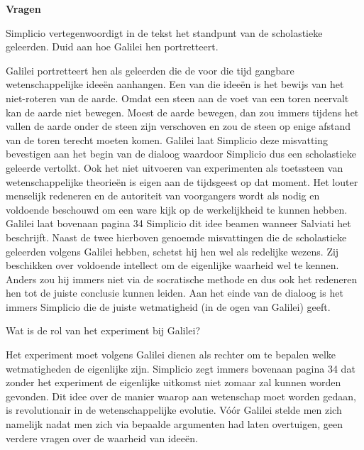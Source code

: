\documentclass{ximera}
\begin{document}
	
	
	\textbf{Vragen}
	\begin{exercise}
    \begin{question}  Simplicio vertegenwoordigt in de tekst het standpunt van de scholastieke geleerden. Duid aan hoe Galilei hen portretteert.
	\begin{oplossing}
	Galilei portretteert hen als geleerden die de voor die tijd gangbare wetenschappelijke ideeën aanhangen. 
	Een van die ideeën is het bewijs van het niet-roteren van de aarde. Omdat een steen aan de voet van een toren neervalt kan de aarde niet bewegen. Moest de aarde bewegen, dan zou immers tijdens het vallen de aarde onder de steen zijn verschoven en zou de steen op enige afstand van de toren terecht moeten komen. Galilei laat Simplicio deze misvatting bevestigen aan het begin van de dialoog waardoor Simplicio dus een scholastieke geleerde vertolkt.
	Ook het niet uitvoeren van experimenten als toetssteen van wetenschappelijke theorieën is eigen aan de tijdsgeest op dat moment. Het louter menselijk redeneren en de autoriteit van voorgangers wordt als nodig en voldoende beschouwd om een ware kijk op de werkelijkheid te kunnen hebben. Galilei laat bovenaan pagina 34 Simplicio dit idee beamen wanneer Salviati het beschrijft.
	Naast de twee hierboven genoemde misvattingen die de scholastieke geleerden volgens Galilei hebben, schetst hij hen wel als redelijke wezens. Zij beschikken over voldoende intellect om de eigenlijke waarheid wel te kennen. Anders zou hij immers niet via de socratische methode en dus ook het redeneren hen tot de juiste conclusie kunnen leiden. Aan het einde van de dialoog is het immers Simplicio die de juiste wetmatigheid (in de ogen van Galilei) geeft.
	\end{oplossing}
	\end{question}
	
    \begin{question}  Wat is de rol van het experiment bij Galilei?
	\begin{oplossing}
	Het experiment moet volgens Galilei dienen als rechter om te bepalen welke wetmatigheden de eigenlijke zijn. Simplicio zegt immers bovenaan pagina 34 dat zonder het experiment de eigenlijke uitkomst niet zomaar zal kunnen worden gevonden. Dit idee over de manier waarop aan wetenschap moet worden gedaan, is revolutionair in de wetenschappelijke evolutie. V\'o\'or Galilei stelde men zich namelijk nadat men zich via bepaalde argumenten had laten overtuigen, geen verdere vragen over de waarheid van ideeën. 
	\end{oplossing}
	\end{question}
	

\end{exercise}
\end{document}
